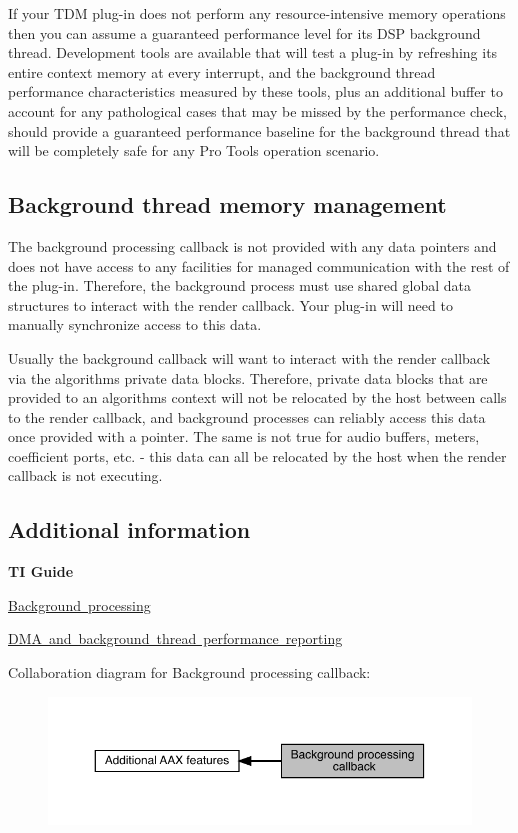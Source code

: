 If your T\+DM plug-\/in does not perform any resource-\/intensive memory operations then you can assume a guaranteed performance level for its D\+SP background thread. Development tools are available that will test a plug-\/in by refreshing its entire context memory at every interrupt, and the background thread performance characteristics measured by these tools, plus an additional buffer to account for any pathological cases that may be missed by the performance check, should provide a guaranteed performance baseline for the background thread that will be completely safe for any Pro Tools operation scenario.\hypertarget{a00811_alg_bg_memmgmt}{}\subsection{Background thread memory management}\label{a00811_alg_bg_memmgmt}
The background processing callback is not provided with any data pointers and does not have access to any facilities for managed communication with the rest of the plug-\/in. Therefore, the background process must use shared global data structures to interact with the render callback. Your plug-\/in will need to manually synchronize access to this data.

Usually the background callback will want to interact with the render callback via the algorithm\textquotesingle{}s private data blocks. Therefore, private data blocks that are provided to an algorithm\textquotesingle{}s context will not be relocated by the host between calls to the render callback, and background processes can reliably access this data once provided with a pointer. The same is not true for audio buffers, meters, coefficient ports, etc. -\/ this data can all be relocated by the host when the render callback is not executing.\hypertarget{a00811_alg_bg_additionalinformation}{}\subsection{Additional information}\label{a00811_alg_bg_additionalinformation}
{\bfseries{TI Guide}} \begin{DoxyItemize}
\item \mbox{\hyperlink{a00832_subsubsection__background_processing_}{Background processing}} \item \mbox{\hyperlink{a00832_subsubsection__dma_and_background_thread_performance_reporting_}{D\+MA and background thread performance reporting}} \end{DoxyItemize}
Collaboration diagram for Background processing callback\+:
\nopagebreak
\begin{figure}[H]
\begin{center}
\leavevmode
\includegraphics[width=350pt]{a00811}
\end{center}
\end{figure}
